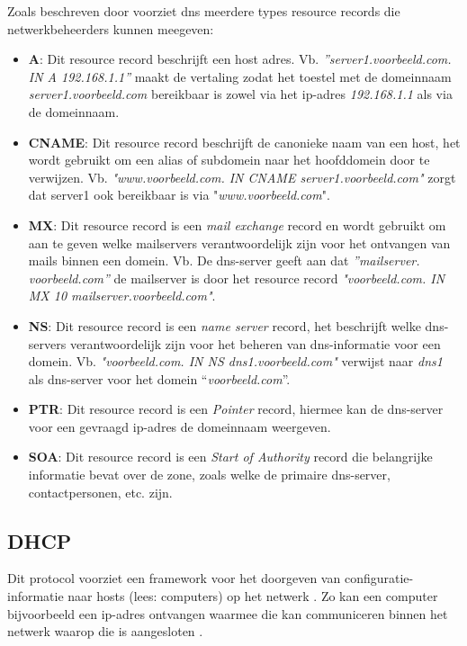{Zoals beschreven door \textcite{Mockapetris1987} voorziet \acrshort{dns} meerdere types resource records die netwerkbeheerders kunnen meegeven: 
\begin{itemize}
    \item \textbf{A}: Dit resource record beschrijft een host adres. 
    Vb. \textit{”server1.voorbeeld.com. IN A 192.168.1.1”} maakt de vertaling zodat het toestel met de domeinnaam \textit{server1.voorbeeld.com} bereikbaar is zowel via het \acrshort{ip}-adres \textit{192.168.1.1} als via de domeinnaam. 
    \item \textbf{CNAME}: Dit resource record beschrijft de canonieke naam van een host, het wordt gebruikt om een alias of subdomein naar het hoofddomein door te verwijzen. Vb. \textit{"www.voorbeeld.com. IN CNAME server1.voorbeeld.com"} zorgt dat server1 ook bereikbaar is via "\textit{www.voorbeeld.com}".
    \item \textbf{MX}: Dit resource record is een \textit{mail exchange} record en wordt gebruikt om aan te geven welke mailservers verantwoordelijk zijn voor het ontvangen van mails binnen een domein. Vb. De \acrshort{dns}-server geeft aan dat \textit{”mailserver.\\voorbeeld.com”} de mailserver is door het resource record \textit{"voorbeeld.com. IN MX 10 mailserver.voorbeeld.com"}.
    \item \textbf{NS}: Dit resource record is een \textit{name server} record, het beschrijft welke \acrshort{dns}-servers verantwoordelijk zijn voor het beheren van \acrshort{dns}-informatie voor een domein. Vb. \textit{"voorbeeld.com. IN NS dns1.voorbeeld.com"} verwijst naar \textit{dns1} als \acrshort{dns}-server voor het domein “\textit{voorbeeld.com}”.
    \item \textbf{PTR}: Dit resource record is een \textit{Pointer} record, hiermee kan de \acrshort{dns}-server voor een gevraagd \acrshort{ip}-adres de domeinnaam weergeven.
    \item \textbf{SOA}: Dit resource record is een \textit{Start of Authority} record die belangrijke informatie bevat over de zone, zoals welke de primaire \acrshort{dns}-server, contactpersonen, etc. zijn.
\end{itemize}

\subsection{DHCP}
Dit protocol voorziet een framework voor het doorgeven van configuratie-informatie naar hosts (lees: computers) op het netwerk . Zo kan een computer bijvoorbeeld een \acrshort{ip}-adres ontvangen waarmee die kan communiceren binnen het netwerk waarop die is aangesloten \autocite{Droms1997}.

}
